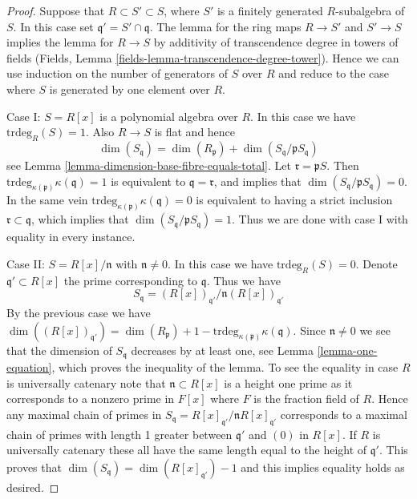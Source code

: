 \begin{proof}
Suppose that $R \subset S' \subset S$, where $S'$ is a finitely generated
$R$-subalgebra of $S$. In this case set $\mathfrak q' = S' \cap \mathfrak q$.
The lemma for the ring maps $R \to S'$ and $S' \to S$ implies the
lemma for $R \to S$ by additivity of transcendence degree in towers
of fields (Fields, Lemma \ref{fields-lemma-transcendence-degree-tower}).
Hence we can use induction on the number of generators
of $S$ over $R$ and reduce to the case where $S$ is generated by
one element over $R$.

\medskip\noindent
Case I: $S = R[x]$ is a polynomial algebra over $R$.
In this case we have $\text{trdeg}_R(S) = 1$.
Also $R \to S$ is flat and hence
$$
\dim(S_{\mathfrak q}) =
\dim(R_{\mathfrak p}) + \dim(S_{\mathfrak q}/\mathfrak pS_{\mathfrak q})
$$
see Lemma \ref{lemma-dimension-base-fibre-equals-total}.
Let $\mathfrak r = \mathfrak pS$. Then
$\text{trdeg}_{\kappa(\mathfrak p)} \kappa(\mathfrak q) = 1$
is equivalent to $\mathfrak q = \mathfrak r$, and implies that
$\dim(S_{\mathfrak q}/\mathfrak pS_{\mathfrak q}) = 0$.
In the same vein $\text{trdeg}_{\kappa(\mathfrak p)} \kappa(\mathfrak q) = 0$
is equivalent to having a strict inclusion
$\mathfrak r \subset \mathfrak q$, which implies that
$\dim(S_{\mathfrak q}/\mathfrak pS_{\mathfrak q}) = 1$.
Thus we are done with case I with equality in every instance.

\medskip\noindent
Case II: $S = R[x]/\mathfrak n$ with $\mathfrak n \not = 0$.
In this case we have $\text{trdeg}_R(S) = 0$.
Denote $\mathfrak q' \subset R[x]$ the prime corresponding to $\mathfrak q$.
Thus we have
$$
S_{\mathfrak q} = (R[x])_{\mathfrak q'}/\mathfrak n(R[x])_{\mathfrak q'}
$$
By the previous case we have
$\dim((R[x])_{\mathfrak q'}) =
\dim(R_{\mathfrak p}) + 1
- \text{trdeg}_{\kappa(\mathfrak p)} \kappa(\mathfrak q)$.
Since $\mathfrak n \not = 0$ we see that the dimension of
$S_{\mathfrak q}$ decreases by at least one, see
Lemma \ref{lemma-one-equation},
which proves the inequality of the lemma.
To see the equality in case $R$ is universally catenary note that
$\mathfrak n \subset R[x]$ is a height one prime as it corresponds
to a nonzero prime in $F[x]$ where $F$ is the fraction field of $R$.
Hence any maximal chain of primes in
$S_\mathfrak q = R[x]_{\mathfrak q'}/\mathfrak nR[x]_{\mathfrak q'}$
corresponds to a maximal chain of primes
with length 1 greater between $\mathfrak q'$ and $(0)$ in $R[x]$.
If $R$ is universally catenary these all have the same length equal to
the height of $\mathfrak q'$. This proves that
$\dim(S_\mathfrak q) = \dim(R[x]_{\mathfrak q'}) - 1$
and this implies equality holds as desired.
\end{proof}

